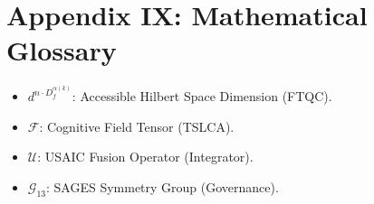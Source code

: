 



\section*{Appendix IX: Mathematical Glossary}
\begin{itemize}
    \item \textbf{$d^{n \cdot D_f^{\alpha(k)}}$}: Accessible Hilbert Space Dimension (FTQC).
    \item \textbf{$\mathcal{F}$}: Cognitive Field Tensor (TSLCA).
    \item \textbf{$\mathcal{U}$}: USAIC Fusion Operator (Integrator).
    \item \textbf{$\mathcal{G}_{13}$}: SAGES Symmetry Group (Governance).
\end{itemize}
